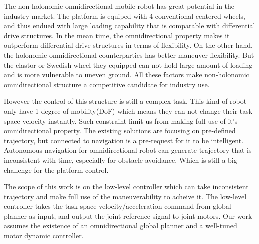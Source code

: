 
The non-holonomic omnidirectional mobile robot has great potential in the industry market. The platform is equiped with 4 conventional centered wheels, and thus endued with large loading capability that is comparable with differential drive structures. In the mean time, the omnidirectional property makes it outperform differential drive structures in terms of flexibility. On the other hand, the holonomic omnidirectional counterparties has better maneuver flexibility. But the clastor or Swedish wheel they equipped can not hold large amount of loading and is more vulnerable to uneven ground. All these factors make non-holonomic omnidirectional structure a competitive candidate for industry use. 


However the control of this structure is still a complex task. This kind of robot only have 1 degree of mobility(DoF) which means they can not change their task space velocity instantly. Such constraint limit us from making full use of it's omnidirectional property. The existing solutions are focusing on pre-defined trajectory, but connected to navigation is a pre-request for it to be intelligent. Autonomous navigation for omnidirectional robot can generate trajectory that is inconsistent with time, especially for obstacle avoidance. Which is still a big challenge for the platform control.

The scope of this work is on the low-level controller which can take inconsistent trajectory and make full use of the maneuverability to acheive it. The low-level controller takes the task space velocity/acceleration command from global planner as input, and output the joint reference signal to joint motors. Our work assumes the existence of an omnidirectional global planner and a well-tuned motor dynamic controller.
